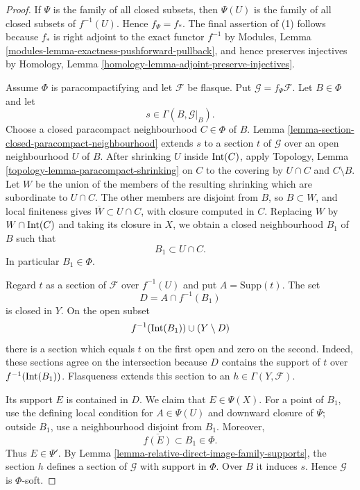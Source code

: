 \begin{proof}
If $\Psi$ is the family of all closed subsets, then $\Psi(U)$ is the family
of all closed subsets of $f^{-1}(U)$. Hence $f_\Psi=f_*$. The final
assertion of (1) follows because $f_*$ is right adjoint to the exact functor
$f^{-1}$ by Modules, Lemma
\ref{modules-lemma-exactness-pushforward-pullback}, and hence preserves
injectives by Homology, Lemma
\ref{homology-lemma-adjoint-preserve-injectives}.

Assume $\Phi$ is paracompactifying and let $\mathcal{F}$ be flasque. Put
$\mathcal{G}=f_\Psi\mathcal{F}$. Let $B \in \Phi$ and let
$$
s \in \Gamma(B,\mathcal{G}|_B).
$$
Choose a closed paracompact neighbourhood $C \in \Phi$ of $B$. Lemma
\ref{lemma-section-closed-paracompact-neighbourhood} extends $s$ to a
section $t$ of $\mathcal{G}$ over an open neighbourhood $U$ of $B$.
After shrinking $U$ inside $\mathop{\rm Int}(C)$, apply Topology, Lemma
\ref{topology-lemma-paracompact-shrinking} on $C$ to the covering by
$U\cap C$ and $C\setminus B$. Let $W$ be the union of the members of the
resulting shrinking which are subordinate to $U\cap C$. The other members
are disjoint from $B$, so $B\subset W$, and local finiteness gives
$\overline{W}\subset U\cap C$, with closure computed in $C$. Replacing $W$
by $W\cap\mathop{\rm Int}(C)$ and taking its closure in $X$, we obtain a
closed neighbourhood $B_1$ of $B$ such that
$$
B_1 \subset U \cap C.
$$
In particular $B_1 \in \Phi$.

Regard $t$ as a section of $\mathcal{F}$ over $f^{-1}(U)$ and put
$A=\text{Supp}(t)$. The set
$$
D=A\cap f^{-1}(B_1)
$$
is closed in $Y$. On the open subset
$$
f^{-1}(\mathop{\rm Int}(B_1)) \cup (Y\setminus D)
$$
there is a section which equals $t$ on the first open and zero on the
second. Indeed, these sections agree on the intersection because $D$
contains the support of $t$ over $f^{-1}(\mathop{\rm Int}(B_1))$.
Flasqueness extends this section to an $h\in\Gamma(Y,\mathcal{F})$.

Its support $E$ is contained in $D$. We claim that $E\in\Psi(X)$. For a
point of $B_1$, use the defining local condition for $A\in\Psi(U)$ and
downward closure of $\Psi$; outside $B_1$, use a neighbourhood disjoint
from $B_1$. Moreover,
$$
\overline{f(E)}\subset B_1\in\Phi.
$$
Thus $E\in\Psi'$. By Lemma
\ref{lemma-relative-direct-image-family-supports}, the section $h$ defines
a section of $\mathcal{G}$ with support in $\Phi$. Over $B$ it induces
$s$. Hence $\mathcal{G}$ is $\Phi$-soft.
\end{proof}

